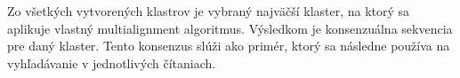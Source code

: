 Zo všetkých vytvorených klastrov je vybraný najväčší klaster, na ktorý sa aplikuje vlastný multialignment algoritmus. Výsledkom je konsenzuálna sekvencia pre daný klaster.
Tento konsenzus slúži ako primér, ktorý sa následne používa na vyhľadávanie v jednotlivých čítaniach.

